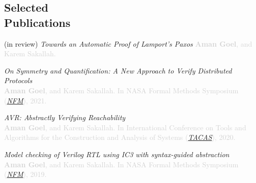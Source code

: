 \documentclass[line,margin,letter]{resume}
\begin{document}
\begin{resume}
\section{\mysidestyle Selected\\Publications \\ 
\href{https://scholar.google.com/citations?user=iFCl5vEAAAAJ&hl=en&oi=sra}{\faGraduationCap}}



\hspace{-2em} (in review) \hspace{0.3em}
\textit{Towards an Automatic Proof of Lamport's Paxos} \hspace{0.3em} \textcolor{lightgray}{\textbf{Aman Goel}, and Karem Sakallah.}

\hspace{-3.8em} \href{https://youtu.be/e0pr3P2BrEU}{\faYoutubePlay} \hspace{0.1em} \href{https://link.springer.com/chapter/10.1007/978-3-030-76384-8_9}{\faFilePdfO} \hspace{0.3em}
\textit{On Symmetry and Quantification: A New Approach to Verify Distributed Protocols} \\
\textcolor{lightgray}{\textbf{Aman Goel}, and Karem Sakallah. In NASA Formal Methods Symposium (\href{https://shemesh.larc.nasa.gov/nfm2021/}{\textit{NFM}}), 2021.}

\hspace{-2em} \href{https://link.springer.com/chapter/10.1007%2F978-3-030-45190-5_23}{\faFilePdfO} \hspace{0.3em}
\textit{AVR: Abstractly Verifying Reachability} \\
\textcolor{lightgray}{\textbf{Aman Goel}, and Karem Sakallah. In International Conference on Tools and Algorithms for the Construction and Analysis of Systems (\href{https://www.etaps.org/2020/tacas}{\textit{TACAS}}), 2020.}

\hspace{-2em} \href{https://link.springer.com/chapter/10.1007/978-3-030-20652-9_11}{\faFilePdfO} \hspace{0.3em}
\textit{Model checking of Verilog RTL using IC3 with syntax-guided abstraction} \\
\textcolor{lightgray}{\textbf{Aman Goel}, and Karem Sakallah. In NASA Formal Methods Symposium (\href{https://robonaut.jsc.nasa.gov/R2/pages/nfm2019.html}{\textit{NFM}}), 2019.}


\end{resume}
\end{document}
